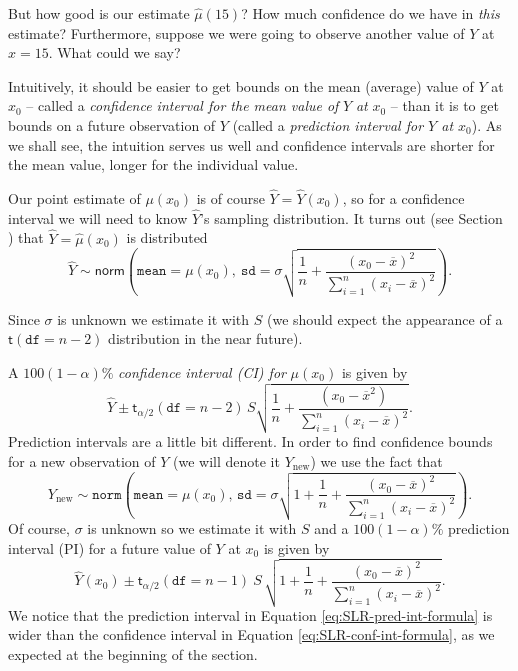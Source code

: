 \documentclass[captions=tableheading]{scrbook}
\begin{document}
But how good is our estimate \(\hat{\mu}(15)\)? How much confidence do we have in \emph{this} estimate? Furthermore, suppose we were going to observe another value of \(Y\) at \(x=15\). What could we say?

Intuitively, it should be easier to get bounds on the mean (average) value of \(Y\) at \(x_{0}\) -- called a \emph{confidence interval for the mean value of} \(Y\) \emph{at} \(x_{0}\) -- than it is to get bounds on a future observation of \(Y\) (called a \emph{prediction interval for \(Y\) at \(x_{0}\)}). As we shall see, the intuition serves us well and confidence intervals are shorter for the mean value, longer for the individual value.

Our point estimate of \(\mu(x_{0})\) is of course \(\hat{Y}=\hat{Y}(x_{0})\), so for a confidence interval we will need to know \(\hat{Y}\)'s sampling distribution. It turns out (see Section ) that \(\hat{Y}=\hat{\mu}(x_{0})\) is distributed
\begin{equation}
\hat{Y}\sim\mathsf{norm}\left(\mathtt{mean}=\mu(x_{0}),\:\mathtt{sd}=\sigma\sqrt{\frac{1}{n}+\frac{(x_{0}-\overline{x})^{2}}{\sum_{i=1}^{n}(x_{i}-\overline{x})^{2}}}\right).
\end{equation}

Since \(\sigma\) is unknown we estimate it with \(S\) (we should expect the appearance of a \(\mathsf{t}(\mathtt{df}=n-2)\) distribution in the near future). 

A \( 100(1-\alpha)\% \) \emph{confidence interval (CI) for} \(\mu(x_{0})\) is given by
\begin{equation}
\hat{Y}\pm\mathsf{t}_{\alpha/2}(\mathtt{df}=n-2)\, S\sqrt{\frac{1}{n}+\frac{(x_{0}-\overline{x}^{2})}{\sum_{i=1}^{n}(x_{i}-\overline{x})^{2}}}.\label{eq:SLR-conf-int-formula}
\end{equation}
Prediction intervals are a little bit different. In order to find confidence bounds for a new observation of \(Y\) (we will denote it \(Y_{\mbox{new}}\)) we use the fact that
\begin{equation}
Y_{\mbox{new}}\sim\mathtt{norm}\left(\mathtt{mean}=\mu(x_{0}),\,\mathtt{sd}=\sigma\sqrt{1+\frac{1}{n}+\frac{(x_{0}-\overline{x})^{2}}{\sum_{i=1}^{n}(x_{i}-\overline{x})^{2}}}\right).
\end{equation}
Of course, \(\sigma\) is unknown so we estimate it with \(S\) and a \( 100(1-\alpha)\% \) prediction interval (PI) for a future value of \(Y\) at \(x_{0}\) is given by 
\begin{equation}
\hat{Y}(x_{0})\pm\mathsf{t}_{\alpha/2}(\mathtt{df}=n-1)\: S\,\sqrt{1+\frac{1}{n}+\frac{(x_{0}-\overline{x})^{2}}{\sum_{i=1}^{n}(x_{i}-\overline{x})^{2}}}.\label{eq:SLR-pred-int-formula}
\end{equation}
We notice that the prediction interval in Equation \ref{eq:SLR-pred-int-formula} is wider than the confidence interval in Equation \ref{eq:SLR-conf-int-formula}, as we expected at the beginning of the section.
\end{document}
